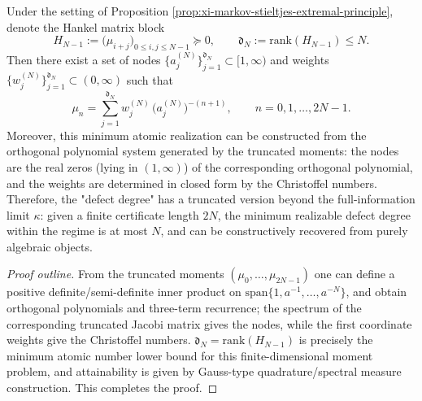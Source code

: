 \begin{proposition}\label{prop:xi-truncated-moment-min-atomic-realization}
Under the setting of Proposition \ref{prop:xi-markov-stieltjes-extremal-principle}, denote the Hankel matrix block
\[
H_{N-1}:=\bigl(\mu_{i+j}\bigr)_{0\le i,j\le N-1}\succeq 0,
\qquad
\mathfrak{d}_N:=\mathrm{rank}(H_{N-1})\le N.
\]
Then there exist a set of nodes \(\{a_j^{(N)}\}_{j=1}^{\mathfrak{d}_N}\subset[1,\infty)\) and weights \(\{w_j^{(N)}\}_{j=1}^{\mathfrak{d}_N}\subset(0,\infty)\) such that
\[
\mu_n=\sum_{j=1}^{\mathfrak{d}_N} w_j^{(N)}\,\bigl(a_j^{(N)}\bigr)^{-(n+1)},
\qquad n=0,1,\dots,2N-1.
\]
Moreover, this minimum atomic realization can be constructed from the orthogonal polynomial system generated by the truncated moments: the nodes are the real zeros (lying in \((1,\infty)\)) of the corresponding orthogonal polynomial, and the weights are determined in closed form by the Christoffel numbers.
Therefore, the "defect degree" has a truncated version beyond the full-information limit \(\kappa\): given a finite certificate length \(2N\), the minimum realizable defect degree within the regime is at most \(N\), and can be constructively recovered from purely algebraic objects.
\end{proposition}
\begin{proof}[Proof outline]
From the truncated moments \((\mu_0,\dots,\mu_{2N-1})\) one can define a positive definite/semi-definite inner product on \(\mathrm{span}\{1,a^{-1},\dots,a^{-N}\}\), and obtain orthogonal polynomials and three-term recurrence; the spectrum of the corresponding truncated Jacobi matrix gives the nodes, while the first coordinate weights give the Christoffel numbers.
\(\mathfrak{d}_N=\mathrm{rank}(H_{N-1})\) is precisely the minimum atomic number lower bound for this finite-dimensional moment problem, and attainability is given by Gauss-type quadrature/spectral measure construction. This completes the proof.
\end{proof}

